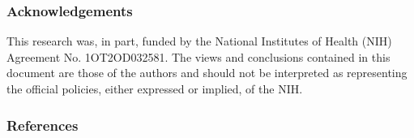 \documentclass[12pt]{beamer}
\begin{document}
\begin{frame}
\frametitle{Acknowledgements}
This research was, in part, funded by the National Institutes of Health (NIH) Agreement No. 1OT2OD032581. The views and conclusions contained in this document are those of the authors and should not be interpreted as representing the official policies, either expressed or implied, of the NIH.
\end{frame}

\begin{frame}
\frametitle{References}
\renewcommand*{\bibfont}{\tiny}
\setlength\bibitemsep{0pt}
\printbibliography[heading=none]
\end{frame}
\end{document}
